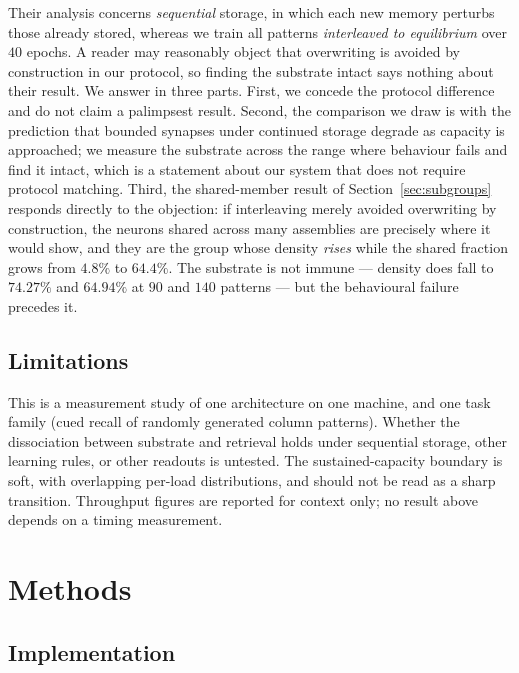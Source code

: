 \documentclass[10pt,twocolumn,a4paper]{article}
\newcommand{\pct}{\%}
\begin{document}
Their analysis concerns \emph{sequential} storage, in which each new memory perturbs those
already stored, whereas we train all patterns \emph{interleaved to equilibrium} over $40$
epochs. A reader may reasonably object that overwriting is avoided by construction in our
protocol, so finding the substrate intact says nothing about their result. We answer in
three parts. First, we concede the protocol difference and do not claim a palimpsest
result. Second, the comparison we draw is with the prediction that bounded synapses under
continued storage degrade as capacity is approached; we measure the substrate across the
range where behaviour fails and find it intact, which is a statement about our system that
does not require protocol matching. Third, the shared-member result of
Section~\ref{sec:subgroups} responds directly to the objection: if interleaving merely
avoided overwriting by construction, the neurons shared across many assemblies are
precisely where it would show, and they are the group whose density \emph{rises} while the
shared fraction grows from $4.8\pct$ to $64.4\pct$. The substrate is not immune --- density
does fall to $74.27\pct$ and $64.94\pct$ at $90$ and $140$ patterns --- but the behavioural
failure precedes it.

\subsection{Limitations}

This is a measurement study of one architecture on one machine, and one task family (cued
recall of randomly generated column patterns). Whether the dissociation between substrate
and retrieval holds under sequential storage, other learning rules, or other readouts is
untested. The sustained-capacity boundary is soft, with overlapping per-load distributions,
and should not be read as a sharp transition. Throughput figures are reported for context
only; no result above depends on a timing measurement.

\section{Methods}
\label{sec:methods}

\subsection{Implementation}
\end{document}
